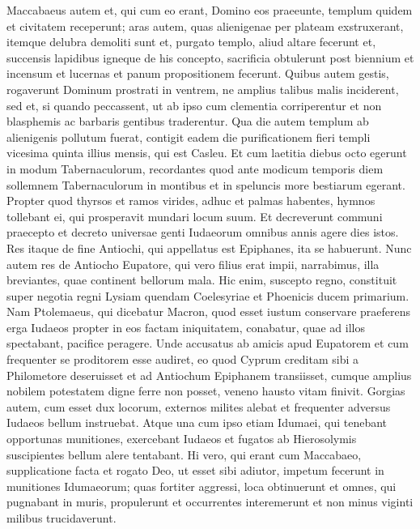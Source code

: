 \begin{biblechapter}
\begin{biblechapter}
\begin{biblechapter}
\begin{biblechapter}
\begin{biblechapter}
\begin{biblechapter}
\begin{biblechapter}
\begin{biblechapter}
\begin{biblechapter}
\begin{biblechapter}
\verse Maccabaeus autem et, qui cum eo erant, Domino eos praeeunte, templum quidem et civitatem receperunt; 
\verse aras autem, quas alienigenae per plateam exstruxerant, itemque delubra demoliti sunt 
\verse et, purgato templo, aliud altare fecerunt et, succensis lapidibus igneque de his concepto, sacrificia obtulerunt post biennium et incensum et lucernas et panum propositionem fecerunt. 
\verse Quibus autem gestis, rogaverunt Dominum prostrati in ventrem, ne amplius talibus malis inciderent, sed et, si quando peccassent, ut ab ipso cum clementia corriperentur et non blasphemis ac barbaris gentibus traderentur. 
 \verse Qua die autem templum ab alienigenis pollutum fuerat, contigit eadem die purificationem fieri templi vicesima quinta illius mensis, qui est Casleu. 
\verse Et cum laetitia diebus octo egerunt in modum Tabernaculorum, recordantes quod ante modicum temporis diem sollemnem Tabernaculorum in montibus et in speluncis more bestiarum egerant. 
\verse Propter quod thyrsos et ramos virides, adhuc et palmas habentes, hymnos tollebant ei, qui prosperavit mundari locum suum. 
\verse Et decreverunt communi praecepto et decreto universae genti Iudaeorum omnibus annis agere dies istos. 
\verse Res itaque de fine Antiochi, qui appellatus est Epiphanes, ita se habuerunt.
 \verse Nunc autem res de Antiocho Eupatore, qui vero filius erat impii, narrabimus, illa breviantes, quae continent bellorum mala. 
\verse Hic enim, suscepto regno, constituit super negotia regni Lysiam quendam Coelesyriae et Phoenicis ducem primarium. 
\verse Nam Ptolemaeus, qui dicebatur Macron, quod esset iustum conservare praeferens erga Iudaeos propter in eos factam iniquitatem, conabatur, quae ad illos spectabant, pacifice peragere. 
\verse Unde accusatus ab amicis apud Eupatorem et cum frequenter se proditorem esse audiret, eo quod Cyprum creditam sibi a Philometore deseruisset et ad Antiochum Epiphanem transiisset, cumque amplius nobilem potestatem digne ferre non posset, veneno hausto vitam finivit.
 \verse Gorgias autem, cum esset dux locorum, externos milites alebat et frequenter adversus Iudaeos bellum instruebat. 
\verse Atque una cum ipso etiam Idumaei, qui tenebant opportunas munitiones, exercebant Iudaeos et fugatos ab Hierosolymis suscipientes bellum alere tentabant. 
\verse Hi vero, qui erant cum Maccabaeo, supplicatione facta et rogato Deo, ut esset sibi adiutor, impetum fecerunt in munitiones Idumaeorum; 
\verse quas fortiter aggressi, loca obtinuerunt et omnes, qui pugnabant in muris, propulerunt et occurrentes interemerunt et non minus viginti milibus trucidaverunt. 

\end{biblechapter}
\end{biblechapter}
\end{biblechapter}
\end{biblechapter}
\end{biblechapter}
\end{biblechapter}
\end{biblechapter}
\end{biblechapter}
\end{biblechapter}
\end{biblechapter}

